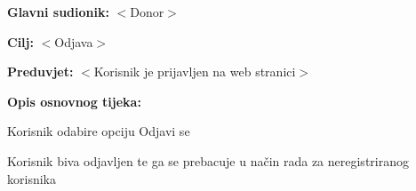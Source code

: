 					\noindent {}
					\begin{packed_item}
						
						\item \textbf{Glavni sudionik:} $<$Donor$>$
						\item \textbf{Cilj:} $<$Odjava$>$
						\item \textbf{Preduvjet:} $<$Korisnik je prijavljen na web stranici$>$
						\item \textbf{Opis osnovnog tijeka:}
						
						\begin{packed_enum}
							
							\item Korisnik odabire opciju Odjavi se
							\item Korisnik biva odjavljen te ga se prebacuje u način rada za neregistriranog korisnika
							
						\end{packed_enum}
						
					\end{packed_item}
					
